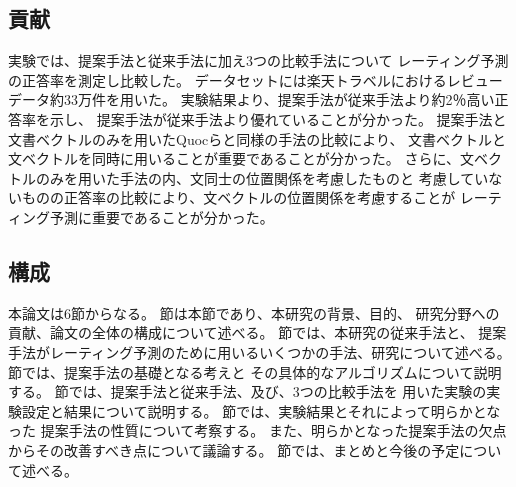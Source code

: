 \subsection{貢献}

実験では、提案手法と従来手法\cite{fujitani15}に加え3つの比較手法について
レーティング予測の正答率を測定し比較した。
データセットには楽天トラベルにおけるレビューデータ約33万件を用いた。
実験結果より、提案手法が従来手法\cite{fujitani15}より約2％高い正答率を示し、
提案手法が従来手法より優れていることが分かった。
提案手法と文書ベクトルのみを用いたQuocら\cite{quoc14}と同様の手法の比較により、
文書ベクトルと文ベクトルを同時に用いることが重要であることが分かった。
さらに、文ベクトルのみを用いた手法の内、文同士の位置関係を考慮したものと
考慮していないものの正答率の比較により、文ベクトルの位置関係を考慮することが
レーティング予測に重要であることが分かった。


\subsection{構成}

本論文は6節からなる。
節は本節であり、本研究の背景、目的、
研究分野への貢献、論文の全体の構成について述べる。
節では、本研究の従来手法\cite{fujitani15}と、
提案手法がレーティング予測のために用いるいくつかの手法、研究について述べる。
節では、提案手法の基礎となる考えと
その具体的なアルゴリズムについて説明する。
節では、提案手法と従来手法、及び、3つの比較手法を
用いた実験の実験設定と結果について説明する。
節では、実験結果とそれによって明らかとなった
提案手法の性質について考察する。
また、明らかとなった提案手法の欠点からその改善すべき点について議論する。
節では、まとめと今後の予定について述べる。

